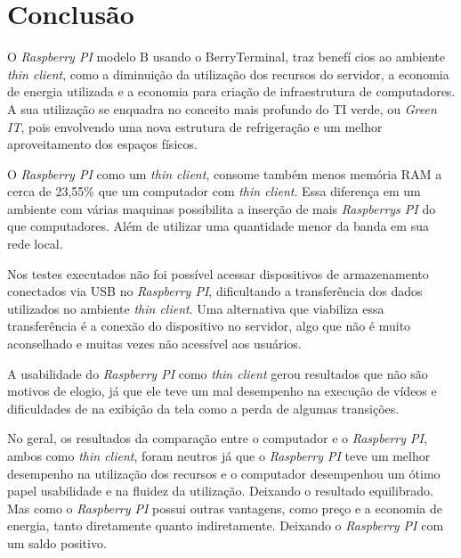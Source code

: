 \documentclass[
	12pt,				%
	openright,			%
	twoside,			%
	a4paper,			%
	chapter=TITLE,		%
	english,			%
	brazil				%
	]{abntex2}
\begin{document}





\chapter{Conclusão}

O \textit{Raspberry PI} modelo B usando o BerryTerminal, traz benefí	cios ao ambiente \textit{thin client}, como a diminuição da utilização dos recursos do servidor, a economia de energia utilizada e a economia para criação de infraestrutura de computadores. A sua utilização se enquadra no conceito mais profundo do TI verde, ou \textit{Green IT}, pois envolvendo uma nova estrutura de refrigeração e um melhor aproveitamento dos espaços físicos. 

O \textit{Raspberry PI} como um \textit{thin client}, consome também menos memória RAM a cerca de 23,55\% que um computador com \textit{thin client}. Essa diferença em um ambiente com várias maquinas possibilita a inserção de mais \textit{Raspberrys PI} do que computadores. Além de utilizar uma quantidade menor da banda em sua rede local.

Nos testes executados não foi possível acessar dispositivos de armazenamento conectados via USB no \textit{Raspberry PI}, dificultando a transferência dos dados utilizados no ambiente \textit{thin client}. Uma alternativa que viabiliza essa transferência é a conexão do dispositivo no servidor, algo que não é muito aconselhado e muitas vezes não acessível aos usuários.

A usabilidade do \textit{Raspberry PI} como \textit{thin client} gerou resultados que não são motivos de elogio, já que ele teve um mal desempenho na execução de vídeos e dificuldades de na exibição da tela como a perda de algumas transições.

No geral, os resultados da comparação entre o computador e o \textit{Raspberry PI}, ambos como \textit{thin client}, foram neutros já que o \textit{Raspberry PI} teve um melhor desempenho na utilização dos recursos e o computador desempenhou um ótimo papel usabilidade e na fluidez da utilização. Deixando o resultado equilibrado. Mas como o \textit{Raspberry PI} possui outras vantagens, como preço e a economia de energia, tanto diretamente quanto indiretamente. Deixando o \textit{Raspberry PI} com um saldo positivo.
\end{document}
